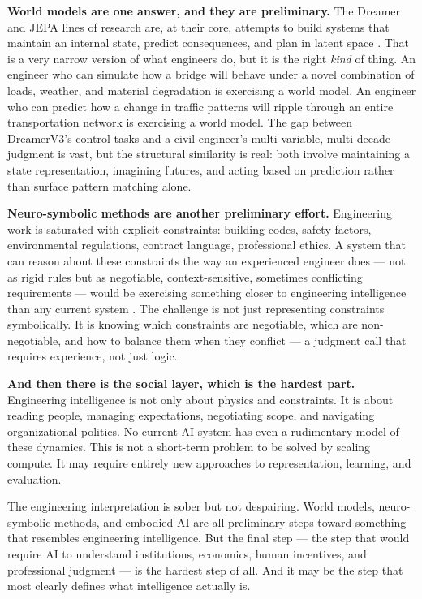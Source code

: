 \documentclass[12pt]{article}
\begin{document}
\textbf{World models are one answer, and they are preliminary.} The Dreamer and JEPA lines of research are, at their core, attempts to build systems that maintain an internal state, predict consequences, and plan in latent space \cite{hafner2025dreamerv3,lecun2022path,assran2025vjepa2}. That is a very narrow version of what engineers do, but it is the right \emph{kind} of thing. An engineer who can simulate how a bridge will behave under a novel combination of loads, weather, and material degradation is exercising a world model. An engineer who can predict how a change in traffic patterns will ripple through an entire transportation network is exercising a world model. The gap between DreamerV3's control tasks and a civil engineer's multi-variable, multi-decade judgment is vast, but the structural similarity is real: both involve maintaining a state representation, imagining futures, and acting based on prediction rather than surface pattern matching alone.

\textbf{Neuro-symbolic methods are another preliminary effort.} Engineering work is saturated with explicit constraints: building codes, safety factors, environmental regulations, contract language, professional ethics. A system that can reason about these constraints the way an experienced engineer does — not as rigid rules but as negotiable, context-sensitive, sometimes conflicting requirements — would be exercising something closer to engineering intelligence than any current system \cite{besold2017nesy,manhaeve2019deepproblog}. The challenge is not just representing constraints symbolically. It is knowing which constraints are negotiable, which are non-negotiable, and how to balance them when they conflict — a judgment call that requires experience, not just logic.

\textbf{And then there is the social layer, which is the hardest part.} Engineering intelligence is not only about physics and constraints. It is about reading people, managing expectations, negotiating scope, and navigating organizational politics. No current AI system has even a rudimentary model of these dynamics. This is not a short-term problem to be solved by scaling compute. It may require entirely new approaches to representation, learning, and evaluation.

The engineering interpretation is sober but not despairing. World models, neuro-symbolic methods, and embodied AI are all preliminary steps toward something that resembles engineering intelligence. But the final step — the step that would require AI to understand institutions, economics, human incentives, and professional judgment — is the hardest step of all. And it may be the step that most clearly defines what intelligence actually is.
\end{document}
